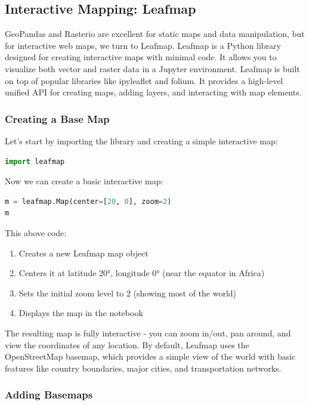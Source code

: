 \subsection{Interactive Mapping: Leafmap}

GeoPandas and Rasterio are excellent for static maps and data manipulation, but for interactive web maps, we turn to Leafmap. Leafmap is a Python library designed for creating interactive maps with minimal code. It allows you to visualize both vector and raster data in a Jupyter environment. Leafmap is built on top of popular libraries like ipyleaflet and folium. It provides a high-level unified API for creating maps, adding layers, and interacting with map elements.

\subsubsection{Creating a Base Map}

Let's start by importing the library and creating a simple interactive map:

\begin{lstlisting}[language=Python]
import leafmap
\end{lstlisting}

Now we can create a basic interactive map:

\begin{lstlisting}[language=Python]
m = leafmap.Map(center=[20, 0], zoom=2)
m
\end{lstlisting}

This above code:

\begin{enumerate}
\item Creates a new Leafmap map object
\item Centers it at latitude 20°, longitude 0° (near the equator in Africa)
\item Sets the initial zoom level to 2 (showing most of the world)
\item Displays the map in the notebook
\end{enumerate}

The resulting map is fully interactive - you can zoom in/out, pan around, and view the coordinates of any location. By default, Leafmap uses the OpenStreetMap basemap, which provides a simple view of the world with basic features like country boundaries, major cities, and transportation networks.

\subsubsection{Adding Basemaps}

